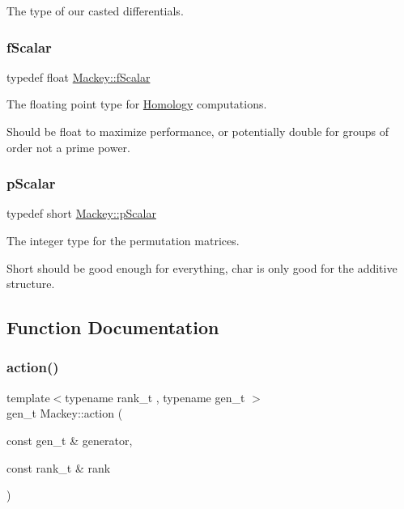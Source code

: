 The type of our casted differentials. 

\mbox{\label{namespaceMackey_aa1901d96dd7e8dd384bb01f47a893552}} 
\subsubsection{\texorpdfstring{f\+Scalar}{fScalar}}
{\footnotesize\ttfamily typedef float \hyperlink{namespaceMackey_aa1901d96dd7e8dd384bb01f47a893552}{Mackey\+::f\+Scalar}}



The floating point type for \hyperlink{classMackey_1_1Homology}{Homology} computations. 

Should be float to maximize performance, or potentially double for groups of order not a prime power. \mbox{\label{namespaceMackey_a67b5f4650ba2f166d15133a1bea2472b}} 
\subsubsection{\texorpdfstring{p\+Scalar}{pScalar}}
{\footnotesize\ttfamily typedef short \hyperlink{namespaceMackey_a67b5f4650ba2f166d15133a1bea2472b}{Mackey\+::p\+Scalar}}

The integer type for the permutation matrices.

Short should be good enough for everything, char is only good for the additive structure. 

\subsection{Function Documentation}
\mbox{\label{namespaceMackey_a3204eaf23b52b27392baaaf0a6898f76}} 
\subsubsection{\texorpdfstring{action()}{action()}}
{\footnotesize\ttfamily template$<$typename rank\+\_\+t , typename gen\+\_\+t $>$ \\
gen\+\_\+t Mackey\+::action (\begin{DoxyParamCaption}\item[{const gen\+\_\+t \&}]{generator,  }\item[{const rank\+\_\+t \&}]{rank }\end{DoxyParamCaption})}



